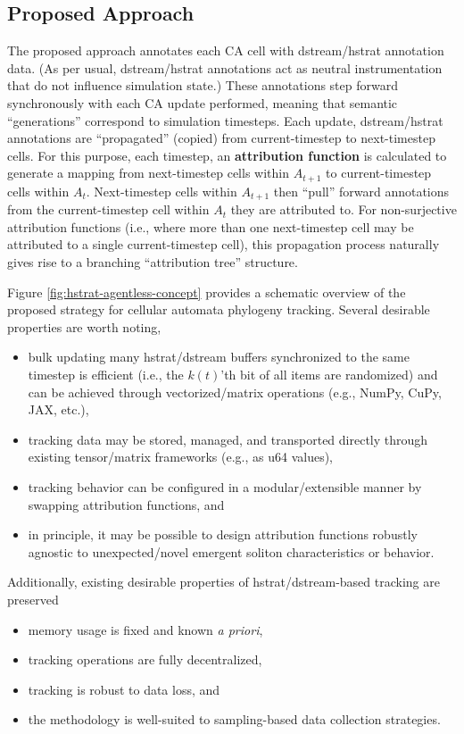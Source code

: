 \subsection{Proposed Approach}



The proposed approach annotates each CA cell with dstream/hstrat annotation data.
(As per usual, dstream/hstrat annotations act as neutral instrumentation that do not influence simulation state.)
These annotations step forward synchronously with each CA update performed, meaning that semantic ``generations'' correspond to simulation timesteps.
Each update, dstream/hstrat annotations are ``propagated'' (copied) from current-timestep to next-timestep cells.
For this purpose, each timestep, an \textbf{attribution function} is calculated to generate a mapping from next-timestep cells within $A_{t+1}$ to current-timestep cells within $A_{t}$.
Next-timestep cells within $A_{t+1}$ then ``pull'' forward annotations from the current-timestep cell within $A_{t}$ they are attributed to.
For non-surjective attribution functions (i.e., where more than one next-timestep cell may be attributed to a single current-timestep cell), this propagation process naturally gives rise to a branching ``attribution tree'' structure.

Figure \ref{fig:hstrat-agentless-concept} provides a schematic overview of the proposed strategy for cellular automata phylogeny tracking.
Several desirable properties are worth noting,
\begin{itemize}
\item bulk updating many hstrat/dstream buffers synchronized to the same timestep is efficient (i.e., the $k(t)$'th bit of all items are randomized) and can be achieved through vectorized/matrix operations (e.g., NumPy, CuPy, JAX, etc.),
\item tracking data may be stored, managed, and transported directly through existing tensor/matrix frameworks (e.g., as u64 values),
\item tracking behavior can be configured in a modular/extensible manner by swapping attribution functions, and
\item in principle, it may be possible to design attribution functions robustly agnostic to unexpected/novel emergent soliton characteristics or behavior.
\end{itemize}
Additionally, existing desirable properties of hstrat/dstream-based tracking are preserved
\begin{itemize}
\item memory usage is fixed and known \textit{a priori},
\item tracking operations are fully decentralized,
\item tracking is robust to data loss, and
\item the methodology is well-suited to sampling-based data collection strategies.
\end{itemize}

